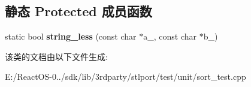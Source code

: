 \subsection*{静态 Protected 成员函数}
\begin{DoxyCompactItemize}
\item 
\mbox{\label{class_sort_test_ac4cd0f2d4b61131482eedde5224c56a8}} 
static bool {\bfseries string\+\_\+less} (const char $\ast$a\+\_\+, const char $\ast$b\+\_\+)
\end{DoxyCompactItemize}


该类的文档由以下文件生成\+:\begin{DoxyCompactItemize}
\item 
E\+:/\+React\+O\+S-\/0../sdk/lib/3rdparty/stlport/test/unit/sort\+\_\+test.\+cpp\end{DoxyCompactItemize}
